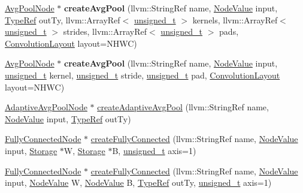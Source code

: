 \begin{DoxyCompactItemize}
\item 
\mbox{\label{classglow_1_1_function_a9732922d9ff497ae3bbbcaa44403b23a}} 
\hyperlink{classglow_1_1_avg_pool_node}{Avg\+Pool\+Node} $\ast$ {\bfseries create\+Avg\+Pool} (llvm\+::\+String\+Ref name, \hyperlink{structglow_1_1_node_value}{Node\+Value} input, \hyperlink{structglow_1_1_type}{Type\+Ref} out\+Ty, llvm\+::\+Array\+Ref$<$ \hyperlink{namespaceglow_a0ca574644e1e42ef193a9947fb4d8911}{unsigned\+\_\+t} $>$ kernels, llvm\+::\+Array\+Ref$<$ \hyperlink{namespaceglow_a0ca574644e1e42ef193a9947fb4d8911}{unsigned\+\_\+t} $>$ strides, llvm\+::\+Array\+Ref$<$ \hyperlink{namespaceglow_a0ca574644e1e42ef193a9947fb4d8911}{unsigned\+\_\+t} $>$ pads, \hyperlink{namespaceglow_aa2f3a33e05699df0f42295c5c4bd1f77}{Convolution\+Layout} layout=N\+H\+WC)
\item 
\mbox{\label{classglow_1_1_function_a76cf51e276c58cbefba50f01a24c1e09}} 
\hyperlink{classglow_1_1_avg_pool_node}{Avg\+Pool\+Node} $\ast$ {\bfseries create\+Avg\+Pool} (llvm\+::\+String\+Ref name, \hyperlink{structglow_1_1_node_value}{Node\+Value} input, \hyperlink{namespaceglow_a0ca574644e1e42ef193a9947fb4d8911}{unsigned\+\_\+t} kernel, \hyperlink{namespaceglow_a0ca574644e1e42ef193a9947fb4d8911}{unsigned\+\_\+t} stride, \hyperlink{namespaceglow_a0ca574644e1e42ef193a9947fb4d8911}{unsigned\+\_\+t} pad, \hyperlink{namespaceglow_aa2f3a33e05699df0f42295c5c4bd1f77}{Convolution\+Layout} layout=N\+H\+WC)
\item 
\hyperlink{classglow_1_1_adaptive_avg_pool_node}{Adaptive\+Avg\+Pool\+Node} $\ast$ \hyperlink{classglow_1_1_function_a5145a97eddf1d1dd26ae7a9de37b341b}{create\+Adaptive\+Avg\+Pool} (llvm\+::\+String\+Ref name, \hyperlink{structglow_1_1_node_value}{Node\+Value} input, \hyperlink{structglow_1_1_type}{Type\+Ref} out\+Ty)
\item 
\hyperlink{classglow_1_1_fully_connected_node}{Fully\+Connected\+Node} $\ast$ \hyperlink{classglow_1_1_function_a369fe971f7e75ca38ff5d6bb0928be89}{create\+Fully\+Connected} (llvm\+::\+String\+Ref name, \hyperlink{structglow_1_1_node_value}{Node\+Value} input, \hyperlink{classglow_1_1_storage}{Storage} $\ast$W, \hyperlink{classglow_1_1_storage}{Storage} $\ast$B, \hyperlink{namespaceglow_a0ca574644e1e42ef193a9947fb4d8911}{unsigned\+\_\+t} axis=1)
\item 
\hyperlink{classglow_1_1_fully_connected_node}{Fully\+Connected\+Node} $\ast$ \hyperlink{classglow_1_1_function_ad38b3e6dd3052c286126ab1239d97aa8}{create\+Fully\+Connected} (llvm\+::\+String\+Ref name, \hyperlink{structglow_1_1_node_value}{Node\+Value} input, \hyperlink{structglow_1_1_node_value}{Node\+Value} W, \hyperlink{structglow_1_1_node_value}{Node\+Value} B, \hyperlink{structglow_1_1_type}{Type\+Ref} out\+Ty, \hyperlink{namespaceglow_a0ca574644e1e42ef193a9947fb4d8911}{unsigned\+\_\+t} axis=1)

\end{DoxyCompactItemize}
